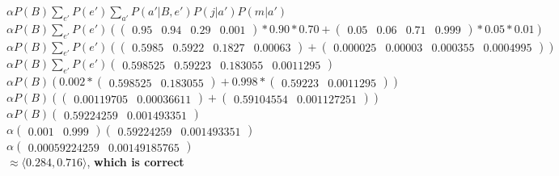 \documentclass{article}
\begin{document}
\begin{enumerate}
\color{blue}
    $\alpha P(B) \sum_{e'} P(e') \sum_{a'} P(a'|B, e')P(j|a')P(m|a')$\\
    $\alpha P(B) \sum_{e'} P(e') (\begin{pmatrix}0.95&0.94&0.29&0.001\end{pmatrix}*0.90*0.70+\begin{pmatrix}0.05&0.06&0.71&0.999\end{pmatrix}*0.05*0.01)$\\
    $\alpha P(B) \sum_{e'} P(e') (\begin{pmatrix}0.5985&0.5922&0.1827&0.00063\end{pmatrix}+\begin{pmatrix}0.000025&0.00003&0.000355&0.0004995\end{pmatrix})$\\
    $\alpha P(B) \sum_{e'} P(e') \begin{pmatrix}0.598525&0.59223&0.183055&0.0011295\end{pmatrix}$\\
    $\alpha P(B) (0.002 * \begin{pmatrix}0.598525&0.183055\end{pmatrix} + 0.998 * \begin{pmatrix}0.59223&0.0011295\end{pmatrix})$\\
    $\alpha P(B) (\begin{pmatrix}0.00119705&0.00036611\end{pmatrix} + \begin{pmatrix}0.59104554&0.001127251\end{pmatrix})$\\
    $\alpha P(B) \begin{pmatrix}0.59224259&0.001493351\end{pmatrix}$\\
    $\alpha \begin{pmatrix}0.001&0.999\end{pmatrix} \begin{pmatrix}0.59224259&0.001493351\end{pmatrix}$\\
    $\alpha \begin{pmatrix}0.00059224259&0.00149185765\end{pmatrix}$\\
    $\approx \langle0.284,0.716\rangle$, \textbf{which is correct}
\color{black}


\end{enumerate}
\end{document}
